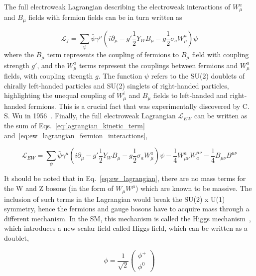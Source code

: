 The full electroweak Lagrangian describing the electroweak interactions of $W_{\mu}^{a}$ and $B_{\mu}$ fields
with fermion fields can be in turn written as

\begin{equation}
        \mathcal{L}_{f}  = \sum_{\psi} \bar{\psi} \gamma^{\mu} \left( i \partial_{\mu} - g' \frac{1}{2} Y_{W} B_{\mu} - g \frac{1}{2} \sigma_{a} W_{\mu}^{a} \right) \psi
    \label{eq:ew_lagrangian_fermion_interactions}
\end{equation}
where the $B_{\mu}$ term represents the coupling of fermions to $B_{\mu}$ field with coupling strength $g'$, and the $W_{\mu}^{a}$ terms
represent the couplings between fermions and $W_{\mu}^{a}$ fields, with coupling strength $g$.
The function $\psi$ refers to the SU(2) doublets of chirally left-handed particles and SU(2) singlets
of right-handed particles, highlighting the unequal coupling of $W_{\mu}^{i}$ and $B_{\mu}$ fields to left-handed and right-handed fermions.
This is a crucial fact that was experimentally discovered by C. S. Wu in 1956~\cite{Wu:1957my}. Finally, the full electroweak Lagrangian
$\mathcal{L}_{EW}$ can be written as the sum of Eqs.~\ref{eq:lagrangian_kinetic_term} and~\ref{eq:ew_lagrangian_fermion_interactions},

\begin{equation}
    \mathcal{L}_{EW} = \sum_{\psi} \bar{\psi} \gamma^{\mu} \left( i \partial_{\mu} - g' \frac{1}{2} Y_{W} B_{\mu} - g \frac{1}{2} \sigma_{a} W_{\mu}^{a} \right) \psi - \frac{1}{4} W_{\mu\nu}^{a} W^{\mu\nu}_{a} -\frac{1}{4} B_{\mu\nu} B^{\mu\nu}
    \label{eq:ew_lagrangian}
\end{equation}

It should be noted that in Eq.~\ref{eq:ew_lagrangian}, there are no mass terms for the $\textrm{W}$ and $\textrm{Z}$ bosons (in the form of $W_{\mu} W^{\mu}$)
which are known to be massive. The inclusion of such terms in the Lagrangian would break the SU(2) x U(1) symmetry, hence the fermions
and gauge bosons have to acquire mass through a different mechanism. In the SM, this mechanism is called the Higgs mechanism~\cite{Higgs:1964pj}, 
which introduces a new scalar field called Higgs field, which can be written as a doublet,

\begin{equation}
    \phi = \frac{1}{\sqrt{2}} \begin{pmatrix}
        \phi^{+} \\ \phi^{0}
    \end{pmatrix}
    \label{eq:higgs_doublet}
\end{equation}

